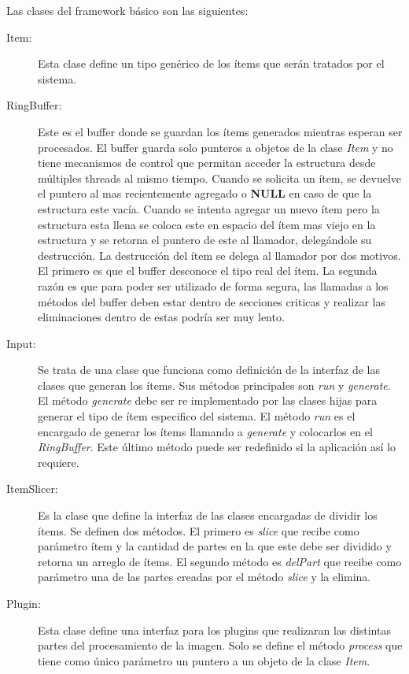 Las clases del framework básico son las siguientes:

\begin{description}

\item[Item:] Esta clase define un tipo genérico de los ítems que serán tratados
	por el sistema.

\item[RingBuffer:] Este es el buffer donde se guardan los ítems generados
	mientras esperan ser procesados. El buffer guarda solo punteros a
	objetos de la clase \emph{Item} y no tiene mecanismos de control que
	permitan acceder la estructura desde múltiples threads al mismo tiempo.
	Cuando se solicita un ítem, se devuelve el puntero al mas recientemente
	agregado o \textbf{NULL} en caso de que la estructura este vacía. Cuando
	se intenta agregar un nuevo ítem pero la estructura esta llena se coloca
	este en espacio del ítem mas viejo en la estructura y se retorna el
	puntero de este al llamador, delegándole su destrucción. La destrucción
	del ítem se delega al llamador por dos motivos. El primero es que el
	buffer desconoce el tipo real del ítem. La segunda razón es que para
	poder ser utilizado de forma segura, las llamadas a los métodos del
	buffer deben estar dentro de secciones criticas y realizar las
	eliminaciones dentro de estas podría ser muy lento.

\item[Input:] Se trata de una clase que funciona como definición de la interfaz
	de las clases que generan los ítems. Sus métodos principales son
	\emph{run} y \emph{generate}. El método \emph{generate} debe ser re
	implementado por las clases hijas para generar el tipo de ítem
	especifico del sistema. El método \emph{run} es el encargado de generar
	los ítems llamando a \emph{generate} y colocarlos en el
	\emph{RingBuffer}. Este último método puede ser redefinido si la
	aplicación así lo requiere.

\item[ItemSlicer:] Es la clase que define la interfaz de las clases encargadas
	de dividir los ítems. Se definen dos métodos. El primero es \emph{slice}
	que recibe como parámetro ítem y la cantidad de partes en la que este
	debe ser dividido y retorna un arreglo de ítems. El segundo método es
	\emph{delPart} que recibe como parámetro una de las partes creadas por
	el método \emph{slice} y la elimina.

\item[Plugin:] Esta clase define una interfaz para los plugins que realizaran
	las distintas partes del procesamiento de la imagen. Solo se define el
	método \emph{process} que tiene como único parámetro un puntero a un
	objeto de la clase \emph{Item}.


\end{description}
